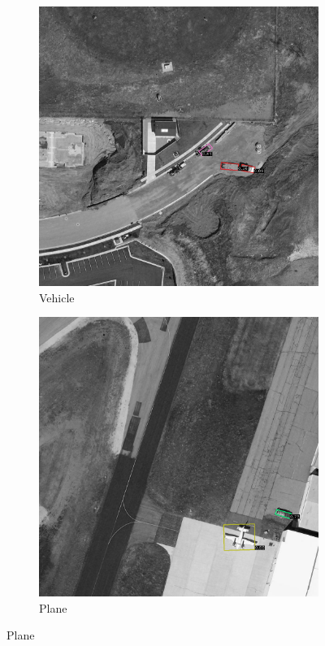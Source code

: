 \begin{figure}[h!]
    \begin{subfigure}[t]{0.38\textwidth}
        \centering
        \includegraphics[width=\linewidth]{images/015Results/03ablation/comp_images/blue/427.png}
        \caption{Vehicle}
    \end{subfigure}
    \begin{subfigure}[t]{0.38\textwidth}
        \centering
        \includegraphics[width=\linewidth]{images/015Results/03ablation/comp_images/blue/487.png}
        \caption{Plane}
    \end{subfigure}
    

\end{figure}
